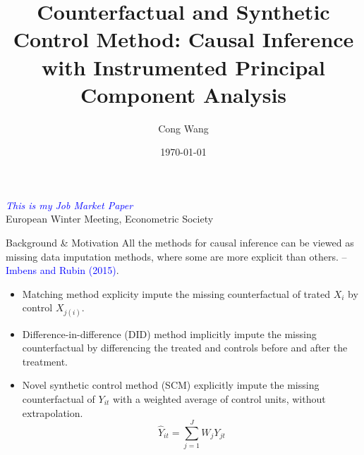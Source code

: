 \documentclass{beamer}
\title{Counterfactual and  Synthetic Control Method: Causal Inference with Instrumented Principal Component Analysis}
\author{Cong Wang}
\institute{Sapienza University of Rome}
\date{\today}
\begin{document}
\begin{frame}
\titlepage
    \centering \textcolor{blue}{\textit{This is my Job Market Paper}} \\
     European Winter Meeting, Econometric Society
\end{frame}

\begin{frame}{Background \& Motivation}
All the methods for causal inference can be viewed as missing data imputation methods, where some are more explicit than others. -- \textcolor{blue}{Imbens and Rubin (2015)}.

\begin{itemize}
    \item Matching method explicity impute the missing counterfactual of trated $X_i$ by control $X_{j(i)}$.
    \item Difference-in-difference (DID) method implicitly impute the missing counterfactual by differencing the treated and controls before and after the treatment.
    \item Novel synthetic control method (SCM) explicitly impute the missing counterfactual of $Y_{it}$ with a weighted average of control units, without extrapolation.
    $$
    \hat{Y}_{it} = \sum_{j=1}^{J} W_{j} Y_{jt}
    $$
\end{itemize}

\end{frame}
\end{document}

